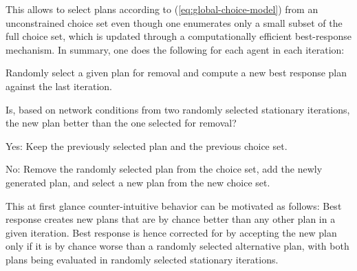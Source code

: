 This allows to select plans according to (\ref{eq:global-choice-model})
from an unconstrained choice set even though one enumerates only a
small subset of the full choice set, which is updated through a computationally
efficient best-response mechanism.
%
%
In summary, one does the following
for each agent in each iteration:
\begin{compactenum}
\item Randomly select a given plan for removal
%
%
and compute a new best response
plan against the last iteration.
\item Is, based on network conditions from two randomly selected stationary
iterations, the new plan better than the one selected for removal?

\begin{compactitem}
\item Yes: Keep the previously selected plan and the previous choice set.
\item No: Remove the randomly selected plan from the choice set, add the
newly generated plan, and select a new plan from the new choice set.
\end{compactitem}
\end{compactenum}
This at first glance counter-intuitive behavior can be motivated as follows:
Best response creates new plans that are by chance
better
%
%
than any other plan in a given iteration. Best response is
hence corrected for by accepting the new plan only if it is by chance
worse than a randomly selected alternative plan, with both plans being
evaluated in randomly selected stationary iterations.

